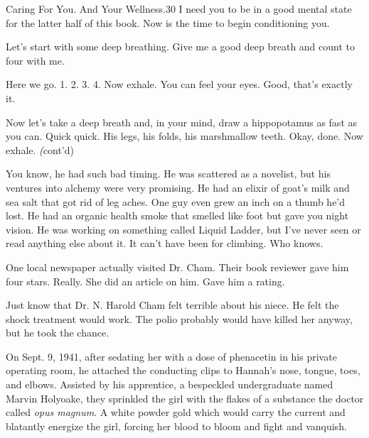 \documentclass[12pt,twoside]{report}
\begin{document}
	\begin{sidebar}{Caring For You. And Your Wellness.}{30}
		I need you to be in a good mental state for the latter half of this book. Now is the time to begin conditioning you.\vspace{6px}
		
		Let's start with some deep breathing. Give me a good deep breath and count to four with me.\vspace{6px}

		Here we go. 1. 2. 3. 4. Now exhale. You can feel your eyes. Good, that's exactly it.\vspace{6px}

		Now let's take a deep breath and, in your mind, draw a hippopotamus as fast as you can. Quick quick. His legs, his folds, his marshmallow teeth. Okay, done. Now exhale. \textit(cont'd)
	\end{sidebar}

You know, he had such bad timing.  He was scattered as a novelist, but
his ventures into alchemy were very promising.  He had an elixir of
goat's milk and sea salt that got rid of leg aches. One guy even grew
an inch on a thumb he'd lost.  He had an organic health smoke that
smelled like foot but gave you night vision.  He was working on
something called Liquid Ladder, but I've never seen or read anything
else about it.  It can't have been for climbing.  Who knows.

One local newspaper actually visited Dr. Cham.  Their book reviewer
gave him four stars. Really.  She did an article on him.  Gave him a
rating.

Just know that Dr. N. Harold Cham felt terrible about his niece.  He
felt the shock treatment would work.  The polio probably would have
killed her anyway, but he took the chance.

On Sept. 9, 1941, after sedating her with a dose of phenacetin in his
private operating room, he attached the conducting clips to Hannah's
nose, tongue, toes, and elbows.  Assisted by his apprentice, a
bespeckled undergraduate named Marvin Holyoake, they sprinkled the
girl with the flakes of a substance the doctor called {\em opus
  magnum}.  A white powder gold which would carry the current and
blatantly energize the girl, forcing her blood to bloom and fight and
vanquish.
\end{document}
